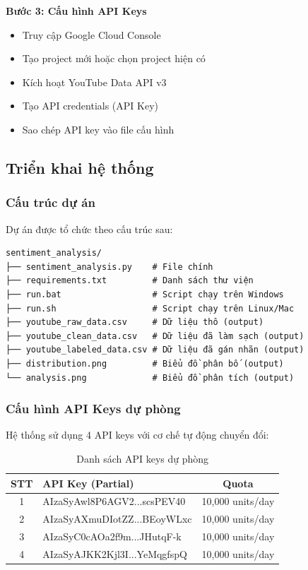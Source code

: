 \textbf{Bước 3: Cấu hình API Keys}
\begin{itemize}
    \item Truy cập Google Cloud Console
    \item Tạo project mới hoặc chọn project hiện có
    \item Kích hoạt YouTube Data API v3
    \item Tạo API credentials (API Key)
    \item Sao chép API key vào file cấu hình
\end{itemize}

\subsection{Triển khai hệ thống}

\subsubsection{Cấu trúc dự án}
Dự án được tổ chức theo cấu trúc sau:

\begin{verbatim}
sentiment_analysis/
├── sentiment_analysis.py    # File chính
├── requirements.txt         # Danh sách thư viện
├── run.bat                  # Script chạy trên Windows
├── run.sh                   # Script chạy trên Linux/Mac
├── youtube_raw_data.csv     # Dữ liệu thô (output)
├── youtube_clean_data.csv   # Dữ liệu đã làm sạch (output)
├── youtube_labeled_data.csv # Dữ liệu đã gán nhãn (output)
├── distribution.png         # Biểu đồ phân bố (output)
└── analysis.png             # Biểu đồ phân tích (output)
\end{verbatim}

\subsubsection{Cấu hình API Keys dự phòng}
Hệ thống sử dụng 4 API keys với cơ chế tự động chuyển đổi:

\begin{table}[H]
\centering
\caption{Danh sách API keys dự phòng}
\begin{tabular}{|c|l|c|}
\hline
\textbf{STT} & \textbf{API Key (Partial)} & \textbf{Quota} \\
\hline
1 & AIzaSyAwl8P6AGV2...scsPEV40 & 10,000 units/day \\
\hline
2 & AIzaSyAXmuDIotZZ...BEoyWLxc & 10,000 units/day \\
\hline
3 & AIzaSyC0cAOa2f9m...JHutqF-k & 10,000 units/day \\
\hline
4 & AIzaSyAJKK2Kjl3I...YeMqgfspQ & 10,000 units/day \\
\hline
\end{tabular}
\end{table}

